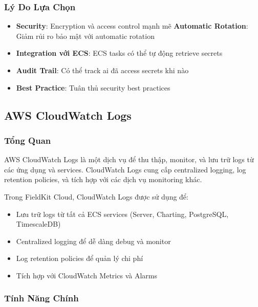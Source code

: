 \subsubsection{Lý Do Lựa Chọn}

\begin{itemize}
    \item \textbf{Security}: Encryption và access control mạnh mẽ
    \textbf{Automatic Rotation}: Giảm rủi ro bảo mật với automatic rotation
    \item \textbf{Integration với ECS}: ECS tasks có thể tự động retrieve secrets
    \item \textbf{Audit Trail}: Có thể track ai đã access secrets khi nào
    \item \textbf{Best Practice}: Tuân thủ security best practices
\end{itemize}

\subsection{AWS CloudWatch Logs}

\subsubsection{Tổng Quan}

AWS CloudWatch Logs là một dịch vụ để thu thập, monitor, và lưu trữ logs từ các ứng dụng và services. CloudWatch Logs cung cấp centralized logging, log retention policies, và tích hợp với các dịch vụ monitoring khác.

Trong FieldKit Cloud, CloudWatch Logs được sử dụng để:
\begin{itemize}
    \item Lưu trữ logs từ tất cả ECS services (Server, Charting, PostgreSQL, TimescaleDB)
    \item Centralized logging để dễ dàng debug và monitor
    \item Log retention policies để quản lý chi phí
    \item Tích hợp với CloudWatch Metrics và Alarms
\end{itemize}

\subsubsection{Tính Năng Chính}

